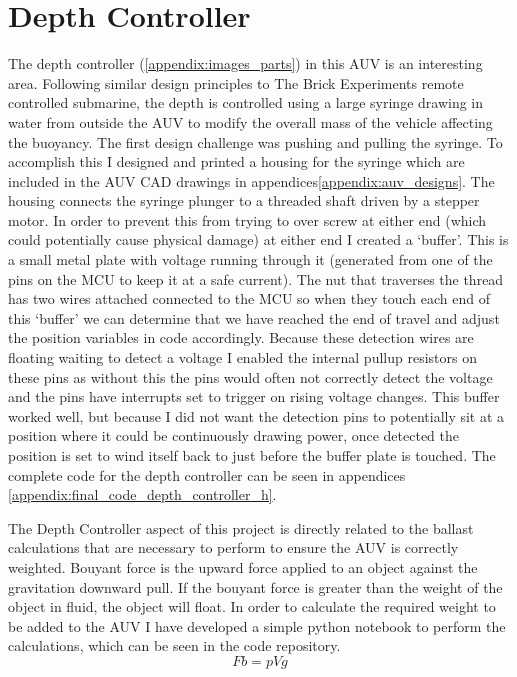 \documentclass[11pt,a4paper,titlepage]{report}
\begin{document}
	\section*{Depth Controller}
	The depth controller (\ref{appendix:images_parts}) in this AUV is an interesting area. Following similar design principles to The Brick Experiments remote controlled submarine, the depth is controlled using a large syringe drawing in water from outside the AUV to modify the overall mass of the vehicle affecting the buoyancy. The first design challenge was pushing and pulling the syringe. To accomplish this I designed and printed a housing for the syringe which are included in the AUV CAD drawings in appendices\ref{appendix:auv_designs}. The housing connects the syringe plunger to a threaded shaft driven by a stepper motor. In order to prevent this from trying to over screw at either end (which could potentially cause physical damage) at either end I created a `buffer'. This is a small metal plate with voltage running through it (generated from one of the pins on the MCU to keep it at a safe current). The nut that traverses the thread has two wires attached connected to the MCU so when they touch each end of this `buffer' we can determine that we have reached the end of travel and adjust the position variables in code accordingly. Because these detection wires are floating waiting to detect a voltage I enabled the internal pullup resistors on these pins as without this the pins would often not correctly detect the voltage and the pins have interrupts set to trigger on rising voltage changes. This buffer worked well, but because I did not want the detection pins to potentially sit at a position where it could be continuously drawing power, once detected the position is set to wind itself back to just before the buffer plate is touched. The complete code for the depth controller can be seen in appendices \ref{appendix:final_code_depth_controller_h}.
	
	The Depth Controller aspect of this project is directly related to the ballast calculations that are necessary to perform to ensure the AUV is correctly weighted. Bouyant force\cite{BOUYANT_FORCE} is the upward force applied to an object against the gravitation downward pull. If the bouyant force is greater than the weight of the object in fluid, the object will float\cite{ARCHIMEDES_PRINCIPLE}. In order to calculate the required weight to be added to the AUV I have developed a simple python notebook to perform the calculations, which can be seen in the code repository\cite{AUV_REPO}. 
	$$
	Fb = pVg
	$$ 
	
\end{document}
